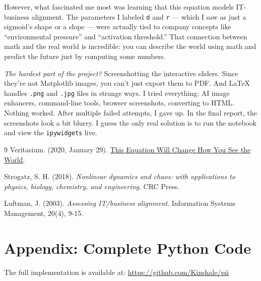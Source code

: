 \documentclass[a4paper, 10pt]{article}
\begin{document}
However, what fascinated me most was learning that this equation models IT-business alignment.
The parameters I labeled \texttt{d} and \texttt{r} — which I saw as just a sigmoid’s shape or a slope — were actually tied to company concepts like “environmental pressure” and “activation threshold.”
That connection between math and the real world is incredible: you can describe the world using math and predict the future just by computing some numbers.

\textit{The hardest part of the project?} Screenshotting the interactive sliders. \newline
Since they’re not Matplotlib images, you can’t just export them to PDF. And LaTeX handles \texttt{.png} and \texttt{.jpg} files in strange ways. I tried everything: AI image enhancers, command-line tools, browser screenshots, converting to HTML. Nothing worked.
After multiple failed attempts, I gave up. In the final report, the screenshots look a bit blurry. I guess the only real solution is to run the notebook and view the \texttt{ipywidgets} live.

\begin{thebibliography}{9}
	Veritasium. (2020, January 29). \href{https://www.veritasium.com/videos/2020/1/29/this-equation-will-change-how-you-see-the-world}{This Equation Will Change How You See the World}.

	Strogatz, S. H. (2018). \textit{Nonlinear dynamics and chaos: with applications to physics, biology, chemistry, and engineering}. CRC Press.

	Luftman, J. (2003). \textit{Assessing IT/business alignment}. Information Systems Management, 20(4), 9-15.
\end{thebibliography}

\appendix
\section{Appendix: Complete Python Code}
The full implementation is available at: \url{https://github.com/Kinshale/pii}
\end{document}
